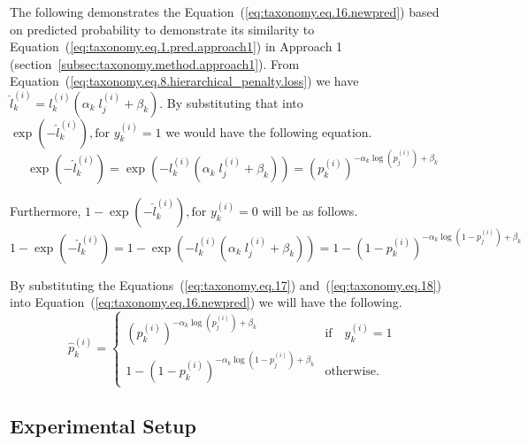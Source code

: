 The following demonstrates the Equation~(\ref{eq:taxonomy.eq.16.newpred}) based on predicted probability to demonstrate its similarity to Equation~(\ref{eq:taxonomy.eq.1.pred.approach1}) in Approach 1 (section~\ref{subsec:taxonomy.method.approach1}). From Equation~(\ref{eq:taxonomy.eq.8.hierarchical_penalty.loss}) we have $\hat{l}_k^{(i)}=l_k^{(i)}\left(\alpha_k\;l_j^{(i)}+\beta_k\right) $. By substituting that into $\exp{\left(-\widehat{l}_{k}^{(i)}\right)}, \text{for } y_{k}^{(i)}=1 $ we would have the following equation.
\begin{equation}
    \label{eq:taxonomy.eq.17}
    \exp{\left(-{\widehat l}_k^{(i)}\right)}=\exp{\left(-l_k^{(i)}\left(\alpha_k\;l_j^{(i)}+\beta_k\right)\right)}={\left(p_k^{(i)}\right)}^{-\alpha_k{\log{\left(p_j^{(i)}\right)}}+\beta_k}
\end{equation}

Furthermore, $1-\exp{\left(-{\widehat l}_k^{(i)}\right)},\text{for } y_k^{(i)}=0 $ will be as follows.
\begin{equation}
    \label{eq:taxonomy.eq.18}
    1-\exp{\left(-{\widehat l}_k^{(i)}\right)}=1-\exp{\left(-l_k^{(i)}\left(\alpha_k\;l_j^{(i)}+\beta_k\right)\right)}={1-\left(1-p_k^{(i)}\right)}^{-\alpha_k{\log{\left(1-p_j^{(i)}\right)}}+\beta_k}
\end{equation}

By substituting the Equations~(\ref{eq:taxonomy.eq.17}) and~(\ref{eq:taxonomy.eq.18})  into Equation~(\ref{eq:taxonomy.eq.16.newpred})  we will have the following.
\begin{equation}
    \label{eq:taxonomy.eq.19.newpred}
    \widehat{p}_k^{(i)} =
    \begin{cases}
        {\left( p_k^{(i)} \right)}^{-\alpha_k \log(p_j^{(i)}) + \beta_k} & \text{if} \quad y_k^{(i)} = 1 \\
        1 - {\left( 1 - p_k^{(i)} \right)}^{-\alpha_k \log{\left( 1 - p_j^{(i)} \right)} + \beta_k} & \text{otherwise.}
    \end{cases}
\end{equation}

\subsection{Experimental Setup}
